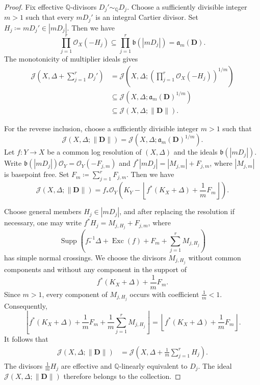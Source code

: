 \documentclass[10pt,a4paper]{amsart}
\def\Exc{\operatorname{Exc}}
\def\Supp{\operatorname{Supp}}
\begin{document}
\begin{proof}
Fix effective $\mathbb Q$-divisors $D_j'\sim_{\mathbb Q}D_j$. Choose a sufficiently divisible integer $m>1$ such that every $mD_j'$ is an integral Cartier divisor. Set $H_j\coloneqq mD_j'\in |mD_j|$. Then we have 
\[
\prod_{j=1}^r\mathcal O_X(-H_j)\subseteq \prod_{j=1}^r\mathfrak b(|mD_j|) = \mathfrak a_m(\mathbf D).
\]
The monotonicity of multiplier ideals gives
\begin{align*}
\mathcal J\left(X,\Delta+\sum_{j=1}^rD_j'\right)
&=
\mathcal J\left(X,\Delta;\left(\prod_{j=1}^r\mathcal O_X(-H_j)\right)^{1/m}\right)\\
&\subseteq
\mathcal J\left(X,\Delta;\mathfrak a_m(\mathbf D)^{1/m}\right)\\
&\subseteq
\mathcal J(X,\Delta;\|\mathbf D\|).
\end{align*}

For the reverse inclusion, choose a sufficiently divisible integer
$m>1$ such that
\[
\mathcal J(X,\Delta;\|\mathbf D\|) = \mathcal J\left(X,\Delta;\mathfrak a_m(\mathbf D)^{1/m}\right).
\]
Let \(f\colon Y\to X\) be a common log resolution of $(X,\Delta)$ and the ideals $\mathfrak b(|mD_j|)$. Write \(\mathfrak b(|mD_j|)\mathcal O_Y = \mathcal O_Y(-F_{j,m})\) and \(f^*|mD_j| = |M_{j,m}|+F_{j,m}\), where $|M_{j,m}|$ is basepoint free. Set $F_m\coloneqq\sum_{j=1}^rF_{j,m}$. Then we have
\[
\mathcal J(X,\Delta;\|\mathbf D\|)
= f_*\mathcal O_Y\left(K_Y-\left\lfloor f^*(K_X+\Delta)+\frac{1}{m}F_m\right\rfloor\right).
\]

Choose general members $H_j\in |mD_j|$, and after replacing the resolution if necessary, one may write \(f^*H_j=M_{j,H_j}+F_{j,m}\), where
\[
\Supp\left(f_*^{-1}\Delta+\Exc(f)+F_m+\sum_{j=1}^rM_{j,H_j}\right)
\]
has simple normal crossings. We choose the divisors $M_{j,H_j}$ without common components and without any component in the support of
\[
f^*(K_X+\Delta)+\frac{1}{m}F_m.
\]
Since $m>1$, every component of $M_{j,H_j}$ occurs with coefficient
$\frac{1}{m}<1$. Consequently,
\[
\left\lfloor
f^*(K_X+\Delta)
+\frac{1}{m}F_m
+\frac{1}{m}\sum_{j=1}^rM_{j,H_j}
\right\rfloor
=
\left\lfloor
f^*(K_X+\Delta)+\frac{1}{m}F_m
\right\rfloor.
\]
It follows that
\begin{align*}
\mathcal J(X,\Delta;\|\mathbf D\|)
&=
\mathcal J\left(X,\Delta+\frac{1}{m}\sum_{j=1}^rH_j\right).
\end{align*}
The divisors $\frac{1}{m}H_j$ are effective and $\mathbb Q$-linearly equivalent to $D_j$. The ideal $\mathcal J(X,\Delta;\|\mathbf D\|)$ therefore belongs to the collection.
\end{proof}
\end{document}
